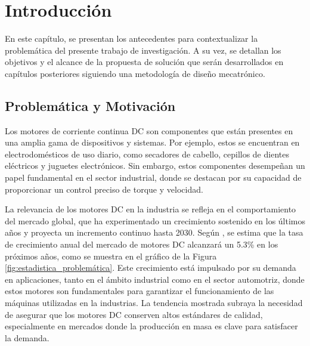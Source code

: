 \chapter{Introducción}
\label{ch:CH01}

\noindent
En este capítulo, se presentan los antecedentes para contextualizar la problemática del presente trabajo de investigación. A su vez, se detallan los objetivos y el alcance de la propuesta de solución que serán desarrollados en capítulos posteriores siguiendo una metodología de diseño mecatrónico.
\section{Problemática y Motivación}
\label{sec:CH01_Problematica}
    
    \noindent
    Los motores de corriente continua \ac{DC} son componentes que están presentes en una amplia gama de dispositivos y sistemas. Por ejemplo, estos se encuentran en electrodomésticos de uso diario, como secadores de cabello, cepillos de dientes eléctricos y juguetes electrónicos. Sin embargo, estos componentes desempeñan un papel fundamental en el sector industrial, donde se destacan por su capacidad de proporcionar un control preciso de torque y velocidad. 

    \noindent
    La relevancia de los motores \ac{DC} en la industria se refleja en el comportamiento del mercado global, que ha experimentado un crecimiento sostenido en los últimos años y proyecta un incremento continuo hasta 2030. Según \textcite{estadistica_motorDC}, se estima que la tasa de crecimiento anual del mercado de motores \ac{DC} alcanzará un 5.3\% en los próximos años, como se muestra en el gráfico de la Figura \ref{fig:estadistica_problemática}. Este crecimiento está impulsado por su demanda en  aplicaciones, tanto en el ámbito industrial como en el sector automotriz, donde estos motores son fundamentales para garantizar el funcionamiento de las máquinas utilizadas en la industrias. La tendencia mostrada subraya la necesidad de asegurar que los motores \ac{DC} conserven altos estándares de calidad, especialmente en mercados donde la producción en masa es clave para satisfacer la demanda. 

